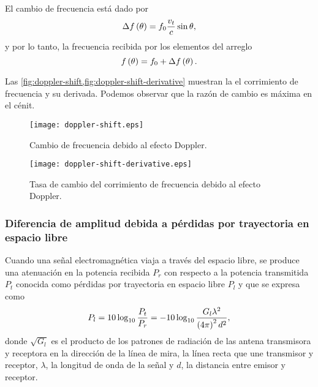 \documentclass{article}
\newenvironment{standalone}{\begin{preview}}{\end{preview}}
\begin{document}
\begin{standalone}
  El cambio de frecuencia está dado por \cite{popescu2016}
  \begin{equation}
    \Delta f \left( \theta \right) = f_0 \frac{v_t}{c} \sin{\theta},
    \tagaddtext{[\si{\hertz}]}
  \end{equation}
  y por lo tanto, la frecuencia recibida por los elementos del arreglo
  \begin{equation}
    f \left( \theta \right) = f_0 + \Delta f \left( \theta \right).
    \tagaddtext{[\si{\hertz}]}
  \end{equation}

  Las \cref{fig:doppler-shift,fig:doppler-shift-derivative} muestran la el corrimiento de frecuencia y su derivada. Podemos observar que la razón de cambio es máxima en el cénit.

  \begin{figure}[!htbp]
    \centering
    \texttt{[image: doppler-shift.eps]}
    \caption{Cambio de frecuencia debido al efecto Doppler.}
    \label{fig:doppler-shift}
  \end{figure}

  \begin{figure}[!htbp]
    \centering
    \texttt{[image: doppler-shift-derivative.eps]}
    \caption{Tasa de cambio del corrimiento de frecuencia debido al efecto Doppler.}
    \label{fig:doppler-shift-derivative}
  \end{figure}

  \subsubsection{Diferencia de amplitud debida a pérdidas por trayectoria en espacio libre}


  Cuando una señal electromagnética viaja a través del espacio libre, se produce una atenuación en la potencia recibida $P_r$ con respecto a la potencia transmitida $P_t$ conocida como pérdidas por trayectoria en espacio libre $P_l$ y que se expresa como \cite[29]{goldsmith2004}
  \begin{equation}
    P_l = 10 \log_{10}{ \frac{P_t}{P_r} } = -10 \log_{10}{ \frac{G_l \lambda^2}{\left( 4\pi \right)^2 d^2} },
    \tagaddtext{[\si{\decibel}]}
  \end{equation}
  donde $\sqrt{G_l}$ es el producto de los patrones de radiación de las antena transmisora y receptora en la dirección de la línea de mira, la línea recta que une transmisor y receptor, $\lambda$, la longitud de onda de la señal y $d$, la distancia entre emisor y receptor.


\end{standalone}
\end{document}
